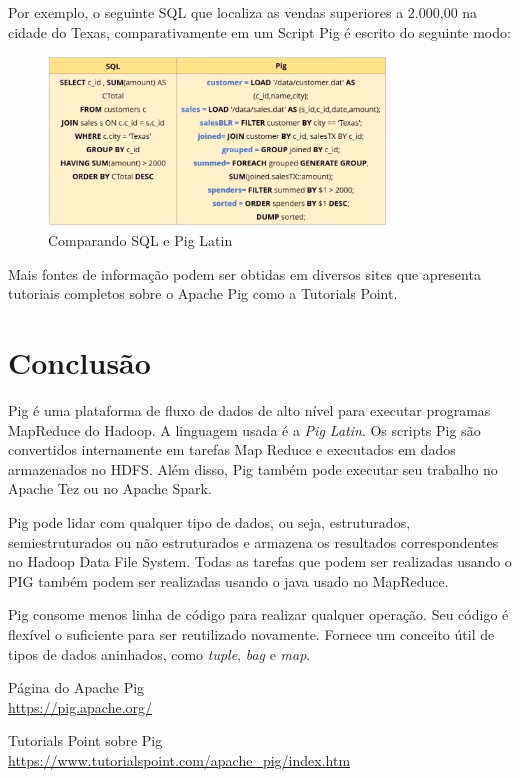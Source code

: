 \documentclass[a4paper,11pt]{article}
\begin{document}
Por exemplo, o seguinte SQL que localiza as vendas superiores a 2.000,00 na cidade do Texas, comparativamente em um Script Pig é escrito do seguinte modo:
\begin{figure}[H]
	\centering
	\includegraphics[width=0.8\textwidth]{imagem/vendas}
	\caption{Comparando SQL e Pig Latin}
\end{figure}

Mais fontes de informação podem ser obtidas em diversos sites que apresenta tutoriais completos sobre o Apache Pig como a Tutorials Point\cite{tutorialspoint}.

\section{Conclusão}
Pig é uma plataforma de fluxo de dados de alto nível para executar programas MapReduce do Hadoop. A linguagem usada é a \textit{Pig Latin}. Os scripts Pig são convertidos internamente em tarefas Map Reduce e executados em dados armazenados no HDFS. Além disso, Pig também pode executar seu trabalho no Apache Tez ou no Apache Spark.

Pig pode lidar com qualquer tipo de dados, ou seja, estruturados, semiestruturados ou não estruturados e armazena os resultados correspondentes no Hadoop Data File System. Todas as tarefas que podem ser realizadas usando o PIG também podem ser realizadas usando o java usado no MapReduce. 

Pig consome menos linha de código para realizar qualquer operação. Seu código é flexível o suficiente para ser reutilizado novamente. Fornece um conceito útil de tipos de dados aninhados, como \textit{tuple}, \textit{bag} e \textit{map}.



\begin{thebibliography}{4}
	Página do Apache Pig \\
	\url{https://pig.apache.org/}

	Tutorials Point sobre Pig \\
	\url{https://www.tutorialspoint.com/apache_pig/index.htm}
	
	
\end{thebibliography}
\end{document}
